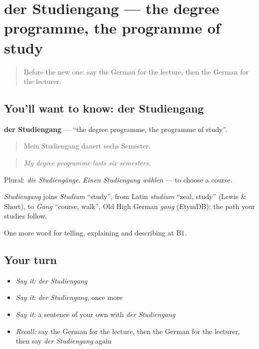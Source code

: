 \section[der Studiengang]{der Studiengang — the degree programme, the programme of study}

\label{lesson:GE-C377-studiengang}



\begin{quote}
Before the new one: say the German for the lecture, then the German for the lecturer.
\end{quote}

\subsection*{You'll want to know: der Studiengang}
\textbf{der Studiengang} — \textquotedblleft{}the degree programme, the programme of study\textquotedblright{}.

\begin{quote}
Mein Studiengang dauert sechs Semester.
\end{quote}

\begin{quote}
\emph{My degree programme lasts six semesters.}
\end{quote}

Plural: \emph{die Studiengänge}. \emph{Einen Studiengang wählen} — to choose a course.

\begin{cousinweb}
\emph{Studiengang} joins \emph{Studium} \textquotedblleft{}study\textquotedblright{}, from Latin \emph{studium} \textquotedblleft{}zeal, study\textquotedblright{} (Lewis \& Short), to \emph{Gang} \textquotedblleft{}course, walk\textquotedblright{}, Old High German \emph{gang} (EtymDB): the path your studies follow.
\end{cousinweb}

\begin{grammarlens}[title={What you've built}]
One more word for telling, explaining and describing at B1.
\end{grammarlens}

\subsection*{Your turn}
\begin{itemize}
\raggedright
  \item \emph{Say it:} \emph{der Studiengang}
  \item \emph{Say it:} \emph{der Studiengang}, once more
  \item \emph{Say it:} a sentence of your own with \emph{der Studiengang}
  \item \emph{Recall:} say the German for the lecture, then the German for the lecturer, then say \emph{der Studiengang} again
\end{itemize}

